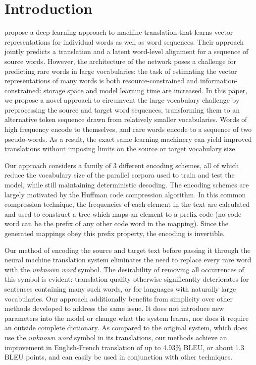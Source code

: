 \section{Introduction}
\label{sec:intro}

 propose a deep learning approach to
machine translation that learns vector representations for individual words as
well as word sequences. Their approach jointly predicts a translation and a
latent word-level alignment for a sequence of source words. However, the architecture of
the network poses a challenge for predicting rare words in large
vocabularies: the task of estimating the vector representations of many words
is both resource-constrained and information-constrained: storage space and model learning time
are increased. In this paper, we
propose a novel approach to circumvent the large-vocabulary challenge by preprocessing the source
and target word sequences, transforming them to an alternative token sequence drawn from
relatively smaller vocabularies. Words of high frequency encode to themselves, and rare
words encode to a sequence of two pseudo-words. As a result, the exact same learning machinery
can yield improved translations without imposing limits on the source or target
vocabulary size.

Our approach considers a family of 3 different encoding schemes, all of which
reduce the vocabulary size of the parallel corpora used to train and test the model,
while still maintaining deterministic decoding. The encoding schemes are largely
motivated by the Huffman code compression algorithm. In this common compression technique,
the frequencies of each element in the text are calculated and used to construct a tree
which maps an element to a prefix code (no code word can be the prefix of any other code
word in the mapping). Since the generated mappings obey this prefix property, the
encoding is invertible.

Our method of encoding the source and target text before passing it through the
neural machine translation system eliminates the need to replace every rare word with the
\emph{unknown word} symbol. The desirability of removing all occurrences of this symbol is evident: translation
quality otherwise significantly deteriorates for sentences containing many such words, or for
languages with naturally large vocabularies. Our approach additionally benefits from simplicity over
other methods developed to address the same issue. It does not introduce
new parameters into the model or change what the system learns, nor does it require an outside complete dictionary.
 As compared to the original system, which does use the \emph{unknown word} symbol in
its translations, our methods achieve an improvement in English-French translation of up to 4.93\% BLEU, or about 1.3 BLEU points,
and can easily be used in conjunction with other techniques.